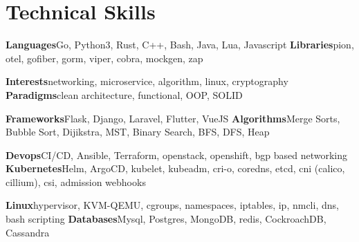 \section{Technical Skills}

\cvdoubleitem
  {\textbf{Languages}}{Go, Python3, Rust, C++, Bash, Java, Lua, Javascript}
  {\textbf{Libraries}}{pion, otel, gofiber, gorm, viper, cobra, mockgen, zap}

\cvdoubleitem
  {\textbf{Interests}}{networking, microservice, algorithm, linux, cryptography}
  {\textbf{Paradigms}}{clean architecture, functional, OOP, SOLID}

\cvdoubleitem
  {\textbf{Frameworks}}{Flask, Django, Laravel, Flutter, VueJS}
  {\textbf{Algorithms}}{Merge Sorts, Bubble Sort, Dijikstra, MST, Binary Search, BFS, DFS, Heap}

\cvdoubleitem
  {\textbf{Devops}}{CI/CD, Ansible, Terraform, openstack, openshift, bgp based networking}
  {\textbf{Kubernetes}}{Helm, ArgoCD, kubelet, kubeadm, cri-o, coredns, etcd, cni (calico, cillium), csi, admission webhooks}

\cvdoubleitem
  {\textbf{Linux}}{hypervisor, KVM-QEMU, cgroups, namespaces, iptables, ip, nmcli, dns, bash scripting}
  {\textbf{Databases}}{Mysql, Postgres, MongoDB, redis, CockroachDB, Cassandra}
